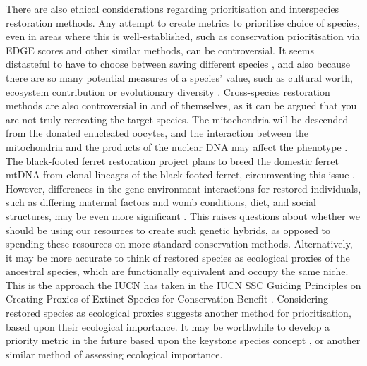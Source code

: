 \documentclass[12pt]{article}
\begin{document}
	
	
	There are also ethical considerations regarding prioritisation and interspecies
	restoration methods.
	Any attempt to create metrics to prioritise choice of species, even in areas
	where this is well-established, such as conservation prioritisation via
	EDGE scores \citep{isaacMammalsEDGEConservation2007} and other
	similar methods, can be controversial.
	It seems distasteful to have to choose between saving different
	species \citep{bottrillConservationTriageJust2008},
	and also because there are so many potential measures of a species' value,
	such as cultural worth, ecosystem contribution or evolutionary diversity
	\citep{breithoffArkBankExtinction2020}.
	Cross-species restoration methods are also controversial in and of themselves,
	as it can be argued that you are not truly recreating the target species.
	The mitochondria will be descended from the donated enucleated oocytes, and
	the interaction between the mitochondria and the products of the nuclear
	DNA may affect the phenotype
	\citep{shapiroPathwaysDeextinctionHow2017}. The black-footed ferret restoration
	project plans to breed the domestic ferret mtDNA from clonal lineages of
	the black-footed ferret, circumventing this issue
	\citep{sandlerEthicalAnalysisCloning2021}. However, differences in the
	gene-environment interactions for restored individuals, such as differing
	maternal factors and womb conditions, diet, and social structures, may
	be even more significant \citep{shapiroPathwaysDeextinctionHow2017}.
	This raises questions about whether we should
	be using our resources to create such genetic hybrids, as opposed to spending
	these resources on more standard conservation methods.
	Alternatively, it may be more accurate to think of restored species
	as ecological proxies of the ancestral species, which are functionally
	equivalent and occupy the same niche. This is the approach
	the IUCN has taken in the IUCN SSC Guiding Principles on
	Creating Proxies of Extinct Species
	for Conservation Benefit \citep{iucn2016iucn}. Considering restored species
	as ecological proxies suggests another method for prioritisation, based upon
	their ecological importance. It may be worthwhile to develop a priority metric
	in the future based upon the keystone species concept
	\citep{davicLinkingKeystoneSpecies2003}, or another similar method of assessing
	ecological importance.
	
\end{document}
